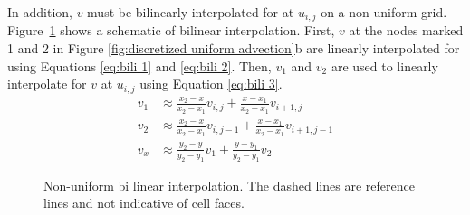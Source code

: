 In addition, $v$ must be bilinearly interpolated for at $u_{i,j}$ on a non-uniform grid.
Figure~\ref{fig:bi-linear-interpolation} shows a schematic of bilinear interpolation.
First, $v$ at the nodes marked 1 and 2 in Figure \ref{fig:discretized uniform advection}b are linearly interpolated for using Equations \eqref{eq:bili 1} and \eqref{eq:bili 2}. 
Then, $v_1$ and $v_2$ are used to linearly interpolate for $v$ at $u_{i,j}$ using Equation \eqref{eq:bili 3}.
\begin{align}
v_1 &\approx \frac{x_2 - x}{x_2 - x_1}v_{i,j} + \frac{x - x_1}{x_2 - x_1}v_{i+1,j} \label{eq:bili 1} \\
v_2 &\approx \frac{x_2 - x}{x_2 - x_1}v_{i,j-1} + \frac{x - x_1}{x_2 - x_1}v_{i+1,j-1} \label{eq:bili 2} \\
v_x &\approx \frac{y_2 - y}{y_2 - y_1}v_{1} + \frac{y - y_1}{y_2 - y_1}v_{2} \; \label{eq:bili 3}
\end{align}
\begin{figure}[!htb]
	\centering
	
	\caption{Non-uniform bi linear interpolation. The dashed lines are reference lines and not indicative of cell faces.}
	\label{fig:bi-linear-interpolation}
\end{figure}

